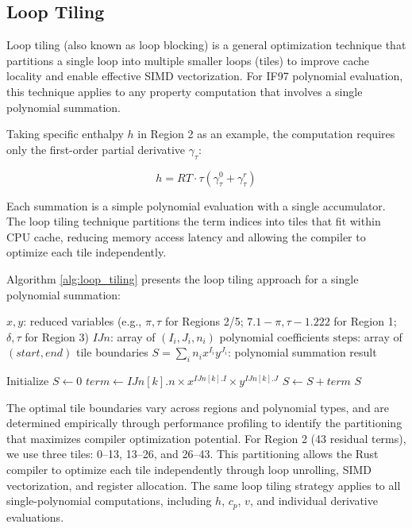 \documentclass{article}
\begin{document}
\subsection{Loop Tiling}

Loop tiling (also known as loop blocking) \cite{LoopTiling} is a general optimization technique that partitions a single loop into multiple smaller loops (tiles) to improve cache locality and enable effective SIMD vectorization. For IF97 polynomial evaluation, this technique applies to any property computation that involves a single polynomial summation.

Taking specific enthalpy $h$ in Region 2 as an example, the computation requires only the first-order partial derivative $\gamma_\tau$:

\begin{equation}
h = RT \cdot \tau \left( \gamma^0_\tau + \gamma^r_\tau \right)
\end{equation}

Each summation is a simple polynomial evaluation with a single accumulator. The loop tiling technique partitions the term indices into tiles that fit within CPU cache, reducing memory access latency and allowing the compiler to optimize each tile independently.

Algorithm \ref{alg:loop_tiling} presents the loop tiling approach for a single polynomial summation:

\begin{algorithm}[H]
\caption{Loop Tiling for Single Polynomial Summation}
\label{alg:loop_tiling}
\begin{algorithmic}[1]
\REQUIRE $x, y$: reduced variables (e.g., $\pi, \tau$ for Regions 2/5; $7.1{-}\pi, \tau{-}1.222$ for Region 1; $\delta, \tau$ for Region 3)
\REQUIRE $IJn$: array of $(I_i, J_i, n_i)$ polynomial coefficients
\REQUIRE $\text{steps}$: array of $(start, end)$ tile boundaries
\ENSURE $S = \sum_i n_i x^{I_i} y^{J_i}$: polynomial summation result

\STATE Initialize $S \leftarrow 0$
        \STATE $term \leftarrow IJn[k].n \times x^{IJn[k].I} \times y^{IJn[k].J}$
        \STATE $S \leftarrow S + term$
    \ENDFOR
\ENDFOR
\RETURN $S$
\end{algorithmic}
\end{algorithm}

The optimal tile boundaries vary across regions and polynomial types, and are determined empirically through performance profiling to identify the partitioning that maximizes compiler optimization potential. For Region 2 (43 residual terms), we use three tiles: 0--13, 13--26, and 26--43. This partitioning allows the Rust compiler to optimize each tile independently through loop unrolling, SIMD vectorization, and register allocation. The same loop tiling strategy applies to all single-polynomial computations, including $h$, $c_p$, $v$, and individual derivative evaluations.
\end{document}
